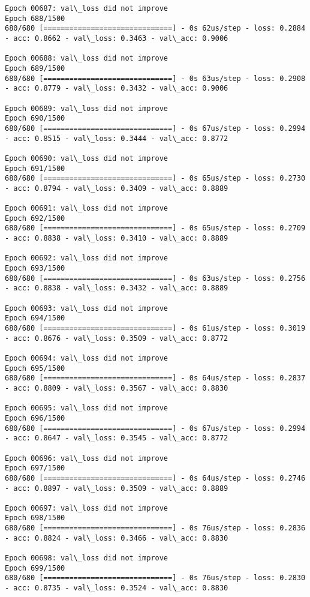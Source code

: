 \documentclass[11pt]{article}
\begin{document}
\begin{Verbatim}[commandchars=\\\{\}]
Epoch 00687: val\_loss did not improve
Epoch 688/1500
680/680 [==============================] - 0s 62us/step - loss: 0.2884 - acc: 0.8662 - val\_loss: 0.3463 - val\_acc: 0.9006

Epoch 00688: val\_loss did not improve
Epoch 689/1500
680/680 [==============================] - 0s 63us/step - loss: 0.2908 - acc: 0.8779 - val\_loss: 0.3432 - val\_acc: 0.9006

Epoch 00689: val\_loss did not improve
Epoch 690/1500
680/680 [==============================] - 0s 67us/step - loss: 0.2994 - acc: 0.8515 - val\_loss: 0.3444 - val\_acc: 0.8772

Epoch 00690: val\_loss did not improve
Epoch 691/1500
680/680 [==============================] - 0s 65us/step - loss: 0.2730 - acc: 0.8794 - val\_loss: 0.3409 - val\_acc: 0.8889

Epoch 00691: val\_loss did not improve
Epoch 692/1500
680/680 [==============================] - 0s 65us/step - loss: 0.2709 - acc: 0.8838 - val\_loss: 0.3410 - val\_acc: 0.8889

Epoch 00692: val\_loss did not improve
Epoch 693/1500
680/680 [==============================] - 0s 63us/step - loss: 0.2756 - acc: 0.8838 - val\_loss: 0.3432 - val\_acc: 0.8889

Epoch 00693: val\_loss did not improve
Epoch 694/1500
680/680 [==============================] - 0s 61us/step - loss: 0.3019 - acc: 0.8676 - val\_loss: 0.3509 - val\_acc: 0.8772

Epoch 00694: val\_loss did not improve
Epoch 695/1500
680/680 [==============================] - 0s 64us/step - loss: 0.2837 - acc: 0.8809 - val\_loss: 0.3567 - val\_acc: 0.8830

Epoch 00695: val\_loss did not improve
Epoch 696/1500
680/680 [==============================] - 0s 67us/step - loss: 0.2994 - acc: 0.8647 - val\_loss: 0.3545 - val\_acc: 0.8772

Epoch 00696: val\_loss did not improve
Epoch 697/1500
680/680 [==============================] - 0s 64us/step - loss: 0.2746 - acc: 0.8897 - val\_loss: 0.3509 - val\_acc: 0.8889

Epoch 00697: val\_loss did not improve
Epoch 698/1500
680/680 [==============================] - 0s 76us/step - loss: 0.2836 - acc: 0.8824 - val\_loss: 0.3466 - val\_acc: 0.8830

Epoch 00698: val\_loss did not improve
Epoch 699/1500
680/680 [==============================] - 0s 76us/step - loss: 0.2830 - acc: 0.8735 - val\_loss: 0.3524 - val\_acc: 0.8830


\end{Verbatim}
\end{document}
